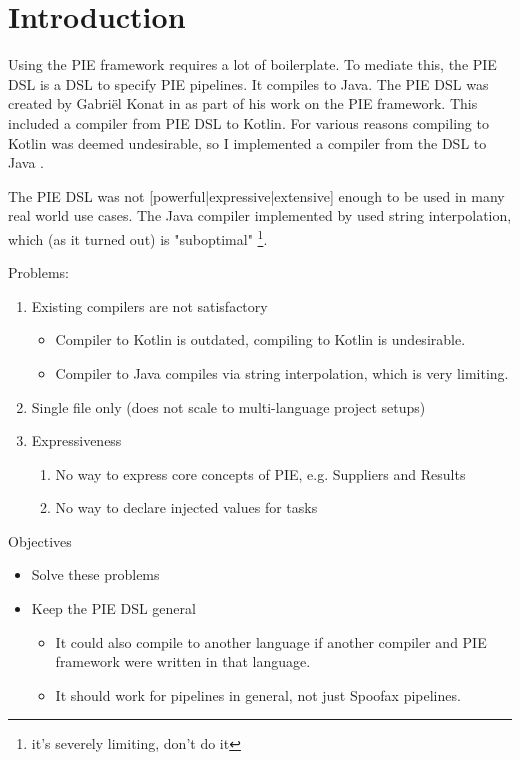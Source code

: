 
\chapter{\label{chap:introduction}Introduction}


Using the PIE framework requires a lot of boilerplate.
To mediate this, the PIE DSL is a DSL to specify PIE pipelines.
It compiles to Java.
The PIE DSL was created by Gabriël Konat in  as part of his work on the PIE framework.
This included a compiler from PIE DSL to Kotlin.
For various reasons compiling to Kotlin was deemed undesirable, so I implemented a compiler from the DSL to Java .

The PIE DSL was not [powerful|expressive|extensive] enough to be used in many real world use cases.
The Java compiler implemented by used string interpolation, which (as it turned out) is "suboptimal" \footnote{it's severely limiting, don't do it}.

Problems:
\begin{enumerate}
  \item Existing compilers are not satisfactory
  \begin{itemize}
     \item Compiler to Kotlin is outdated, compiling to Kotlin is undesirable.
     \item Compiler to Java compiles via string interpolation, which is very limiting.
   \end{itemize}
  \item Single file only (does not scale to multi-language project setups)
  \item Expressiveness
  \begin{enumerate}
    \item No way to express core concepts of PIE, e.g. Suppliers and Results
    \item No way to declare injected values for tasks
  \end{enumerate}
\end{enumerate}

Objectives
\begin{itemize}
  \item Solve these problems
  \item Keep the PIE DSL general
  \begin{itemize}
    \item It could also compile to another language if another compiler and PIE framework were written in that language.
    \item It should work for pipelines in general, not just Spoofax pipelines.
  \end{itemize}
\end{itemize}

